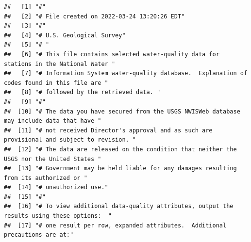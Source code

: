 \documentclass[
]{book}
\begin{document}
\begin{verbatim}
##   [1] "#"                                                                                                                                            
##   [2] "# File created on 2022-03-24 13:20:26 EDT"                                                                                                    
##   [3] "#"                                                                                                                                            
##   [4] "# U.S. Geological Survey"                                                                                                                     
##   [5] "# "                                                                                                                                           
##   [6] "# This file contains selected water-quality data for stations in the National Water "                                                         
##   [7] "# Information System water-quality database.  Explanation of codes found in this file are "                                                   
##   [8] "# followed by the retrieved data. "                                                                                                           
##   [9] "#"                                                                                                                                            
##  [10] "# The data you have secured from the USGS NWISWeb database may include data that have "                                                       
##  [11] "# not received Director's approval and as such are provisional and subject to revision. "                                                     
##  [12] "# The data are released on the condition that neither the USGS nor the United States "                                                        
##  [13] "# Government may be held liable for any damages resulting from its authorized or "                                                            
##  [14] "# unauthorized use."                                                                                                                          
##  [15] "#"                                                                                                                                            
##  [16] "# To view additional data-quality attributes, output the results using these options:  "                                                      
##  [17] "# one result per row, expanded attributes.  Additional precautions are at:"                                                                   

\end{verbatim}
\end{document}
